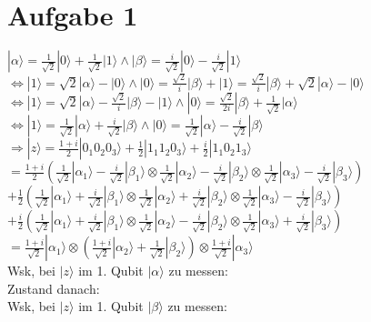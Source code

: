 \documentclass[a4paper]{scrartcl}
\begin{document}
\section*{Aufgabe 1}
$|\alpha\rangle = \frac{1}{\sqrt{2}}|0\rangle + \frac{1}{\sqrt{2}}|1\rangle \land |\beta\rangle = \frac{i}{\sqrt{2}}|0\rangle - \frac{i}{\sqrt{2}}|1\rangle$\\
$\Leftrightarrow |1\rangle = \sqrt{2} |\alpha\rangle-|0\rangle \land |0\rangle = \frac{\sqrt{2}}{i} |\beta\rangle+|1\rangle = \frac{\sqrt{2}}{i} |\beta\rangle + \sqrt{2} |\alpha\rangle-|0\rangle$\\
$\Leftrightarrow |1\rangle = \sqrt{2} |\alpha\rangle-\frac{\sqrt{2}}{i} |\beta\rangle-|1\rangle \land |0\rangle = \frac{\sqrt{2}}{2i} |\beta\rangle + \frac{1}{\sqrt{2}} |\alpha\rangle$\\
$\Leftrightarrow |1\rangle = \frac{1}{\sqrt{2}} |\alpha\rangle+\frac{i}{\sqrt{2}} |\beta\rangle \land |0\rangle =\frac{1}{\sqrt{2}} |\alpha\rangle - \frac{i}{\sqrt{2}} |\beta\rangle $\\
$\Rightarrow |z\rangle = \frac{1+i}{2} |0_1 0_2 0_3\rangle  + \frac{1}{2} |1_1 1_2 0_3\rangle + \frac{i}{2} |1_1 0_2 1_3\rangle $\\
$= \frac{1+i}{2}( \frac{1}{\sqrt{2}} |\alpha_1\rangle - \frac{i}{\sqrt{2}} |\beta_1\rangle \otimes \frac{1}{\sqrt{2}} |\alpha_2\rangle - \frac{i}{\sqrt{2}} |\beta_2\rangle \otimes \frac{1}{\sqrt{2}} |\alpha_3\rangle - \frac{i}{\sqrt{2}} |\beta_3\rangle )$\\
$+ \frac{1}{2} (\frac{1}{\sqrt{2}} |\alpha_1\rangle+\frac{i}{\sqrt{2}} |\beta_1\rangle \otimes \frac{1}{\sqrt{2}} |\alpha_2\rangle+\frac{i}{\sqrt{2}} |\beta_2\rangle \otimes \frac{1}{\sqrt{2}} |\alpha_3\rangle - \frac{i}{\sqrt{2}} |\beta_3\rangle ) $\\
$+ \frac{i}{2} (\frac{1}{\sqrt{2}} |\alpha_1\rangle+\frac{i}{\sqrt{2}} |\beta_1\rangle \otimes \frac{1}{\sqrt{2}} |\alpha_2\rangle - \frac{i}{\sqrt{2}} |\beta_2\rangle \otimes \frac{1}{\sqrt{2}} |\alpha_3\rangle+\frac{i}{\sqrt{2}} |\beta_3\rangle ) $\\
$= \frac{1+i}{\sqrt{2}} |\alpha_1\rangle \otimes (\frac{1+i}{\sqrt{2}} |\alpha_2\rangle + \frac{1}{\sqrt{2}} |\beta_2\rangle) \otimes \frac{1+i}{\sqrt{2}} |\alpha_3\rangle $\\

Wsk, bei $|z\rangle$ im 1. Qubit $|\alpha\rangle$ zu messen:\\

Zustand danach:\\
Wsk, bei $|z\rangle$ im 1. Qubit $|\beta\rangle$ zu messen:\\
\end{document}
